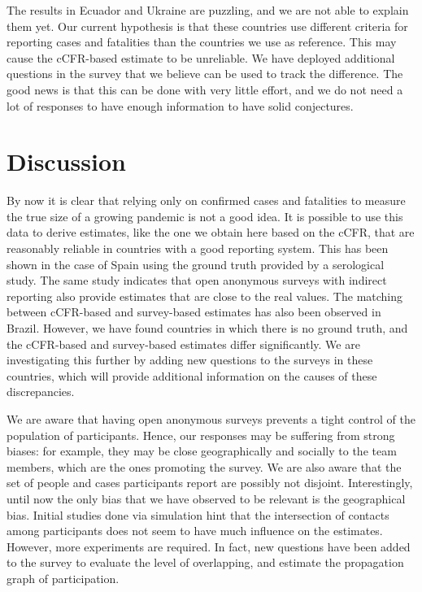 \documentclass[sigconf]{acmart}
\newcommand{\af}[1]{{#1}}
\begin{document}
The results in Ecuador and Ukraine are puzzling, and we are not able to explain them yet. Our current hypothesis is that these countries use different criteria for reporting cases and fatalities than the countries we use as reference. This may cause the cCFR-based estimate to be unreliable. We have deployed additional questions in the survey that we believe can be used to track the difference. The good news is that this can be done with very little effort, and we do not need a lot of responses to have enough information to have solid conjectures.

\section{Discussion}

By now it is clear that relying only on confirmed cases and fatalities to measure the true size of a growing pandemic is not a good idea. It is possible to use this data to derive estimates, like the one we obtain here based on the cCFR, that are
reasonably reliable in countries with a good reporting system. This has been shown in the case of Spain using the ground
truth provided by a serological study. The same study indicates that open anonymous surveys with indirect reporting also provide estimates that are close to the real values. The matching between cCFR-based and survey-based estimates has also been observed in Brazil. However, we have found countries in which there is no ground truth, and the cCFR-based and survey-based estimates differ significantly. We are investigating this further by adding new questions to the surveys in these countries,
which will provide additional information on the causes of these discrepancies.

We are aware that having open anonymous surveys prevents a tight control of the population of participants. Hence, our responses may be suffering from strong biases: for example, they may be close geographically and socially to the team members, which are the ones promoting the survey. We are also aware that the set of people and cases participants report are possibly not disjoint. Interestingly, until now the only bias that we have observed to be relevant is the geographical bias. \af{Initial studies done via simulation hint that the} intersection of contacts among participants does not seem to have much influence on the estimates. \af{However, more experiments are required. In fact, new questions have been added to the survey to evaluate the level of overlapping, and estimate the propagation graph of participation.}
\end{document}
